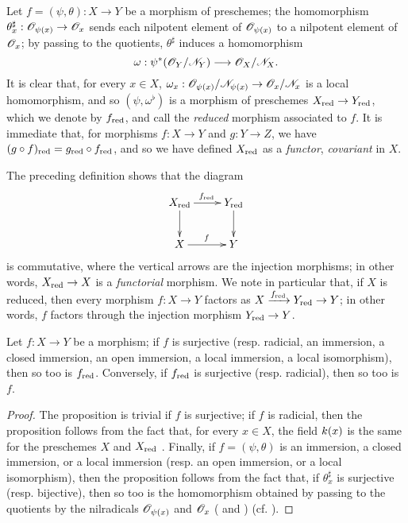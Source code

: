 \begin{env}[5.1.5]
\label{1.5.1.5}
Let $f=(\psi,\theta):X\to Y$ be a morphism of preschemes;
the homomorphism $\theta_x^\sharp:\sh{O}_{\psi(x)}\to\sh{O}_x$ sends each nilpotent element of $\mathscr{O}_{\psi(x)}$ to a nilpotent element of $\mathscr{O}_x$;
by passing to the quotients, $\theta^\sharp$ induces a homomorphism
\[
  \omega:\psi^*(\sh{O}_Y/\sh{N}_Y)\to\sh{O}_X/\sh{N}_X.
\]
It is clear that, for every $x\in X$, $\omega_x:\sh{O}_{\psi(x)}/\sh{N}_{\psi(x)}\to\sh{O}_x/\sh{N}_x$ is a local homomorphism, and so $(\psi,\omega^\flat)$ is a morphism of preschemes $X_\red\to Y_\red$, which we denote by $f_{\mathrm{red}}$, and call the \emph{reduced} morphism associated to $f$.
It is immediate that, for morphisms $f:X\to Y$ and $g:Y\to Z$, we have $(g\circ f)_{\mathrm{red}}=g_{\mathrm{red}}\circ f_{\mathrm{red}}$, and so we have defined $X_{\mathrm{red}}$ as a \emph{functor}, \emph{covariant} in $X$.

The preceding definition shows that the diagram
\[
  \xymatrix{
    X_\red\ar[r]^{f_\red}\ar[d] &
    Y_\red\ar[d]\\
    X\ar[r]^f &
    Y
  }
\]
is commutative, where the vertical arrows are the injection morphisms;
in other words, $X_\red\to X$ is a \emph{functorial} morphism.
We note in particular that, if $X$ is reduced, then every morphism $f:X\to Y$ factors as $X\xrightarrow{f_\red}Y_\red\to Y$;
in other words, $f$ factors through the injection morphism $Y_\red\to Y$.
\end{env}

\begin{proposition}[5.1.6]
\label{1.5.1.6}
Let $f:X\to Y$ be a morphism;
if $f$ is surjective (resp. radicial, an immersion, a closed immersion, an open immersion, a local immersion, a local isomorphism), then so too is $f_{\mathrm{red}}$.
Conversely, if $f_{\mathrm{red}}$ is surjective (resp. radicial), then so too is $f$.
\end{proposition}

\begin{proof}
\label{proof-1.5.1.6}
The proposition is trivial if $f$ is surjective;
if $f$ is radicial, then the proposition follows from the fact that, for every $x\in X$, the field $k(x)$ is the same for the preschemes $X$ and $X_{\mathrm{red}}$ .
Finally, if $f=(\psi,\theta)$ is an immersion, a closed immersion, or a local immersion (resp. an open immersion, or a local isomorphism), then the proposition follows from the fact that, if $\theta_x^\sharp$ is surjective (resp. bijective), then so too is the homomorphism obtained by passing to the quotients by the nilradicals $\mathscr{O}_{\psi(x)}$ and $\mathscr{O}_x$ ( and ) (cf. ).
\end{proof}

